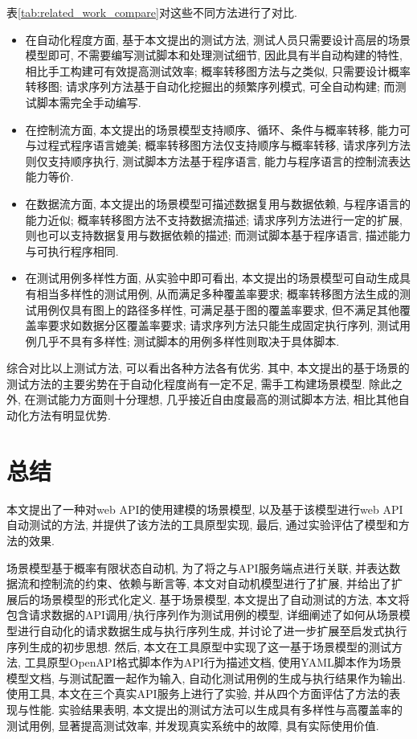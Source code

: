         表\ref{tab:related_work_compare}对这些不同方法进行了对比. 
        \begin{itemize}
            \item 在自动化程度方面, 基于本文提出的测试方法, 测试人员只需要设计高层的场景模型即可, 不需要编写测试脚本和处理测试细节, 因此具有半自动构建的特性, 相比手工构建可有效提高测试效率; 概率转移图方法与之类似, 只需要设计概率转移图; 请求序列方法基于自动化挖掘出的频繁序列模式, 可全自动构建; 而测试脚本需完全手动编写.
            \item 在控制流方面, 本文提出的场景模型支持顺序、循环、条件与概率转移, 能力可与过程式程序语言媲美; 概率转移图方法仅支持顺序与概率转移, 请求序列方法则仅支持顺序执行, 测试脚本方法基于程序语言, 能力与程序语言的控制流表达能力等价.
            \item 在数据流方面, 本文提出的场景模型可描述数据复用与数据依赖, 与程序语言的能力近似; 概率转移图方法不支持数据流描述; 请求序列方法进行一定的扩展, 则也可以支持数据复用与数据依赖的描述; 而测试脚本基于程序语言, 描述能力与可执行程序相同.
            \item 在测试用例多样性方面, 从实验中即可看出, 本文提出的场景模型可自动生成具有相当多样性的测试用例, 从而满足多种覆盖率要求; 概率转移图方法生成的测试用例仅具有图上的路径多样性, 可满足基于图的覆盖率要求, 但不满足其他覆盖率要求如数据分区覆盖率要求; 请求序列方法只能生成固定执行序列, 测试用例几乎不具有多样性; 测试脚本的用例多样性则取决于具体脚本.
        \end{itemize}
        综合对比以上测试方法, 可以看出各种方法各有优劣. 其中, 本文提出的基于场景的测试方法的主要劣势在于自动化程度尚有一定不足, 需手工构建场景模型. 除此之外, 在测试能力方面则十分理想, 几乎接近自由度最高的测试脚本方法, 相比其他自动化方法有明显优势.
    
    \section{总结}
        本文提出了一种对web API的使用建模的场景模型, 以及基于该模型进行web API自动测试的方法, 并提供了该方法的工具原型实现, 最后, 通过实验评估了模型和方法的效果.
        
        场景模型基于概率有限状态自动机, 为了将之与API服务端点进行关联, 并表达数据流和控制流的约束、依赖与断言等, 本文对自动机模型进行了扩展, 并给出了扩展后的场景模型的形式化定义. 基于场景模型, 本文提出了自动测试的方法, 本文将包含请求数据的API调用/执行序列作为测试用例的模型, 详细阐述了如何从场景模型进行自动化的请求数据生成与执行序列生成, 并讨论了进一步扩展至启发式执行序列生成的初步思想. 然后, 本文在工具原型中实现了这一基于场景模型的测试方法, 工具原型OpenAPI格式脚本作为API行为描述文档, 使用YAML脚本作为场景模型文档, 与测试配置一起作为输入, 自动化测试用例的生成与执行结果作为输出. 使用工具, 本文在三个真实API服务上进行了实验, 并从四个方面评估了方法的表现与性能. 实验结果表明, 本文提出的测试方法可以生成具有多样性与高覆盖率的测试用例, 显著提高测试效率, 并发现真实系统中的故障, 具有实际使用价值.
    
